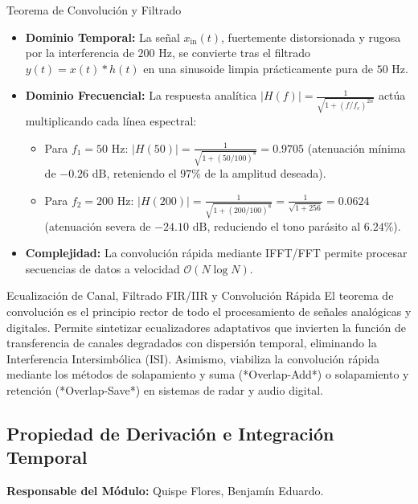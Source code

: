 \documentclass[11pt,a4paper]{article}
\begin{document}
\begin{dspResultBox}{Teorema de Convoluci\'on y Filtrado}
\begin{itemize}[noitemsep]
  \item \textbf{Dominio Temporal:} La se\~nal $x_{\text{in}}(t)$, fuertemente distorsionada y rugosa por la interferencia de $200\text{ Hz}$, se convierte tras el filtrado $y(t) = x(t)*h(t)$ en una sinusoide limpia pr\'acticamente pura de $50\text{ Hz}$.
  \item \textbf{Dominio Frecuencial:} La respuesta anal\'itica $|H(f)| = \frac{1}{\sqrt{1 + (f/f_c)^{2n}}}$ act\'ua multiplicando cada l\'inea espectral:
  \begin{itemize}
    \item Para $f_1 = 50\text{ Hz}$: $|H(50)| = \frac{1}{\sqrt{1 + (50/100)^8}} = 0.9705$ (atenuaci\'on m\'inima de $-0.26\text{ dB}$, reteniendo el $97\%$ de la amplitud deseada).
    \item Para $f_2 = 200\text{ Hz}$: $|H(200)| = \frac{1}{\sqrt{1 + (200/100)^8}} = \frac{1}{\sqrt{1 + 256}} = 0.0624$ (atenuaci\'on severa de $-24.10\text{ dB}$, reduciendo el tono par\'asito al $6.24\%$).
  \end{itemize}
  \item \textbf{Complejidad:} La convoluci\'on r\'apida mediante IFFT/FFT permite procesar secuencias de datos a velocidad $\mathcal{O}(N \log N)$.
\end{itemize}
\end{dspResultBox}

\begin{telecomAppBox}{Ecualizaci\'on de Canal, Filtrado FIR/IIR y Convoluci\'on R\'apida}
El teorema de convoluci\'on es el principio rector de todo el procesamiento de se\~nales anal\'ogicas y digitales. Permite sintetizar ecualizadores adaptativos que invierten la funci\'on de transferencia de canales degradados con dispersi\'on temporal, eliminando la Interferencia Intersimb\'olica (ISI). Asimismo, viabiliza la convoluci\'on r\'apida mediante los m\'etodos de solapamiento y suma (*Overlap-Add*) o solapamiento y retenci\'on (*Overlap-Save*) en sistemas de radar y audio digital.
\end{telecomAppBox}

\subsection{Propiedad de Derivaci\'on e Integraci\'on Temporal}
\textbf{Responsable del M\'odulo:} Quispe Flores, Benjam\'in Eduardo.
\end{document}
